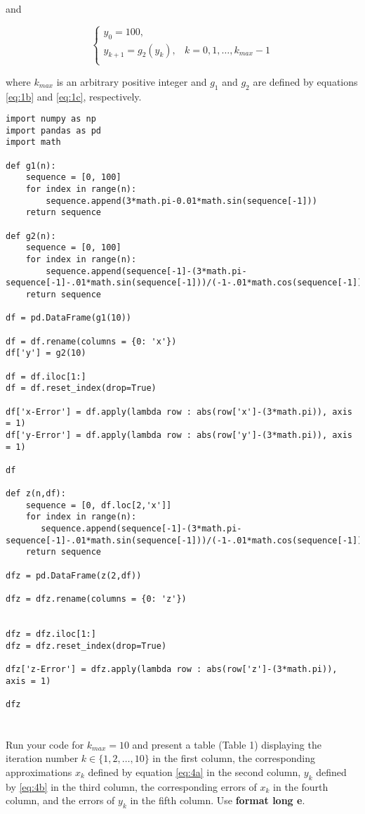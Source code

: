 \documentclass{article}
\begin{document}
and 

\begin{equation}\label{eq:4b}
    \begin{cases}
    y_0 = 100,\\
    y_{k+1}= g_2(y_k), & k=0,1,\dots , k_{max}-1\\
    \end{cases}
\end{equation}

where $k_{max}$ is an arbitrary positive integer and $g_1$ and $g_2$ are defined by equations \ref{eq:1b} and \ref{eq:1c}, respectively. 

\vspace{10mm}

\begin{verbatim}
import numpy as np
import pandas as pd
import math

def g1(n):
    sequence = [0, 100]
    for index in range(n):
        sequence.append(3*math.pi-0.01*math.sin(sequence[-1]))
    return sequence
    
def g2(n):
    sequence = [0, 100]
    for index in range(n):
        sequence.append(sequence[-1]-(3*math.pi-sequence[-1]-.01*math.sin(sequence[-1]))/(-1-.01*math.cos(sequence[-1])))
    return sequence
    
df = pd.DataFrame(g1(10))

df = df.rename(columns = {0: 'x'})
df['y'] = g2(10)

df = df.iloc[1:]
df = df.reset_index(drop=True)

df['x-Error'] = df.apply(lambda row : abs(row['x']-(3*math.pi)), axis = 1)
df['y-Error'] = df.apply(lambda row : abs(row['y']-(3*math.pi)), axis = 1)

df   

def z(n,df):
    sequence = [0, df.loc[2,'x']]
    for index in range(n):
       sequence.append(sequence[-1]-(3*math.pi-sequence[-1]-.01*math.sin(sequence[-1]))/(-1-.01*math.cos(sequence[-1])))
    return sequence

dfz = pd.DataFrame(z(2,df))

dfz = dfz.rename(columns = {0: 'z'})


dfz = dfz.iloc[1:]
dfz = dfz.reset_index(drop=True)

dfz['z-Error'] = dfz.apply(lambda row : abs(row['z']-(3*math.pi)), axis = 1)

dfz
\end{verbatim}


\section{}
Run your code for $k_{max}=10$ and present a table (Table 1) displaying the iteration number $k \in \{1,2,\dots,10\}$ in the first column, the corresponding approximations $x_k$ defined by equation \ref{eq:4a} in the second column, $y_k$ defined by \ref{eq:4b} in the third column, the corresponding errors of $x_k$ in the fourth column, and the errors of $y_k$ in the fifth column. Use {\selectfont \textbf{format long e}}.
\vspace{10mm}
\end{document}
